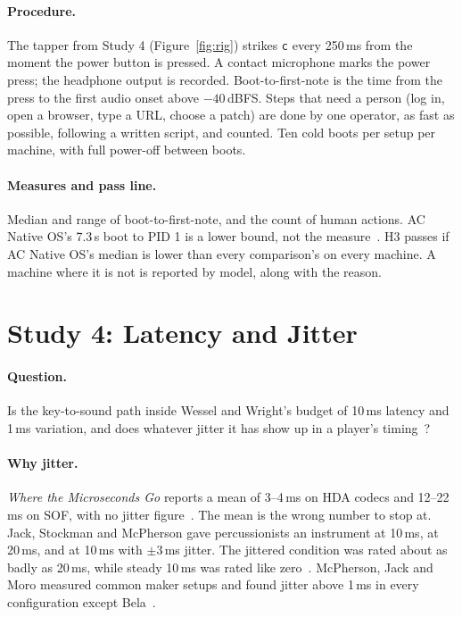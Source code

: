 \documentclass[10pt,letterpaper,twocolumn]{article}
\newcommand{\acos}{AC Native OS}
\newcommand{\key}[1]{\texttt{#1}}
\begin{document}
\paragraph{Procedure.} The tapper from Study 4 (Figure~\ref{fig:rig}) strikes \key{c} every 250\,ms from the moment the power button is pressed. A contact microphone marks the power press; the headphone output is recorded. Boot-to-first-note is the time from the press to the first audio onset above $-40$\,dBFS. Steps that need a person (log in, open a browser, type a URL, choose a patch) are done by one operator, as fast as possible, following a written script, and counted. Ten cold boots per setup per machine, with full power-off between boots.

\paragraph{Measures and pass line.} Median and range of boot-to-first-note, and the count of human actions. \acos{}'s 7.3\,s boot to PID 1 is a lower bound, not the measure~\citep{scudder2026os}. H3 passes if \acos{}'s median is lower than every comparison's on every machine. A machine where it is not is reported by model, along with the reason.

\section{Study 4: Latency and Jitter}
\label{sec:s4}


\paragraph{Question.} Is the key-to-sound path inside Wessel and Wright's budget of 10\,ms latency and 1\,ms variation, and does whatever jitter it has show up in a player's timing~\citep{wessel2002problems}?

\paragraph{Why jitter.} \emph{Where the Microseconds Go} reports a mean of 3--4\,ms on HDA codecs and 12--22\,ms on SOF, with no jitter figure~\citep{scudder2026latency}. The mean is the wrong number to stop at. Jack, Stockman and McPherson gave percussionists an instrument at 10\,ms, at 20\,ms, and at 10\,ms with $\pm3$\,ms jitter. The jittered condition was rated about as badly as 20\,ms, while steady 10\,ms was rated like zero~\citep{jack2016latency}. McPherson, Jack and Moro measured common maker setups and found jitter above 1\,ms in every configuration except Bela~\citep{mcpherson2016latency}.
\end{document}
